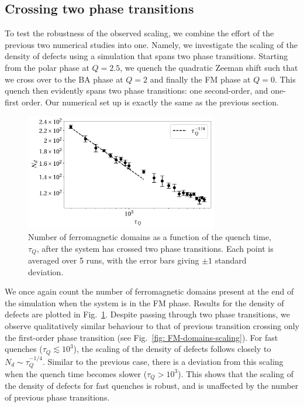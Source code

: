 \subsection{Crossing two phase transitions}
To test the robustness of the observed scaling, we combine the effort of the
previous two numerical studies into one.
Namely, we investigate the scaling of the density of defects using a simulation
that spans two phase transitions.
Starting from the polar phase at \(Q  = 2.5\), we quench the quadratic Zeeman
shift such that we cross over to the BA phase at \(Q=2\) and finally the FM
phase at \(Q=0\).
This quench then evidently spans two phase transitions: one second-order, and
one-first order.
Our numerical set up is exactly the same as the previous section.

\begin{figure}
    \centering
    \includegraphics[width=0.75\textwidth]{gfx/ch-spin1/polar-BA-FM_domains.pdf}
    \caption{\label{fig: polar-ba-fm-defects}Number of ferromagnetic domains as
    a function of the quench time, \(\tau_Q\), after the system has crossed two
    phase transitions.
    Each point is averaged over 5 runs, with the error bars giving \(\pm 1\)
    standard deviation.}
\end{figure}
We once again count the number of ferromagnetic domains present at the end of
the simulation when the system is in the FM phase.
Results for the density of defects are plotted in
Fig.~\ref{fig: polar-ba-fm-defects}.
Despite passing through two phase transitions, we observe qualitatively similar
behaviour to that of previous transition crossing only the first-order phase
transition (see Fig.~\ref{fig: FM-domains-scaling}).
For fast quenches (\(\tau_Q \lesssim 10^3 \)), the scaling of the density of
defects follows closely to \(N_d \sim \tau_Q^{-1/4}\).
Similar to the previous case, there is a deviation from this scaling when the
quench time becomes slower (\(\tau_Q > 10^3\)).
This shows that the scaling of the density of defects for fast quenches is
robust, and is unaffected by the number of previous phase transitions.
